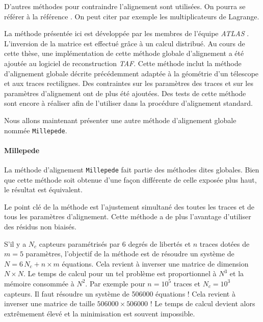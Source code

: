    D'autres m\'ethodes pour contraindre l'alignement sont utilis\'ees. On pourra se r\'ef\'erer \`a la r\'ef\'erence \cite{de2012alignment}. On peut citer par exemple les multiplicateurs de Lagrange.
   
   \medskip
   
   La m\'ethode pr\'esent\'ee ici est d\'evelopp\'ee par les membres de l'\'equipe \textit{ATLAS} \cite{de2012alignment} \cite{Bruckman:2005uxa}. L'inversion de la matrice est effectu\'e grâce \`a un calcul distribu\'e. Au cours de cette th\`ese, une impl\'ementation de cette m\'ethode globale d'alignement a \'et\'e ajout\'ee au logiciel de reconstruction \textit{TAF}. Cette m\'ethode inclut la m\'ethode d'alignement globale d\'ecrite pr\'ec\'edemment adapt\'ee \`a la g\'eom\'etrie d'un t\'elescope et aux traces rectilignes. Des contraintes sur les param\`etres des traces et sur les param\`etres d'alignement ont de plus \'et\'e ajout\'ees. Des tests de cette m\'ethode sont encore \`a r\'ealiser afin de l'utiliser dans la proc\'edure d'alignement standard.
   
   \medskip
   
   Nous allons maintenant pr\'esenter une autre m\'ethode d'alignement globale nomm\'ee \texttt{Millepede}.
   
   \paragraph{Millepede}
   
  La m\'ethode d'alignement \texttt{Millepede} \cite{Blobel:2002ax} \cite{Blobel20065} fait partie des m\'ethodes dites globales. Bien que cette m\'ethode soit obtenue d'une façon diff\'erente de celle expos\'ee plus haut, le r\'esultat est \'equivalent.

  \medskip

  Le point cl\'e de la m\'ethode est l'ajustement simultan\'e des toutes les traces et de tous les param\`etres d'alignement. Cette m\'ethode a de plus l'avantage d'utiliser des r\'esidus non biais\'es. 
  
  \medskip
  
  S'il y a $N_c$ capteurs param\'etris\'es par $6$ degr\'es de libert\'es et $n$ traces dot\'ees de $m=5$ param\`etres, l'objectif de la m\'ethode est de r\'esoudre un syst\`eme de $N = 6 \, N_c + n \times m$ \'equations. Cela revient \`a inverser une matrice de dimension $N \times N$. Le temps de calcul pour un tel probl\`eme est proportionnel \`a $N^3$ et la m\'emoire consomm\'ee \`a $N^2$. Par exemple pour $n=10^5$ traces et $N_c = 10^3$ capteurs. Il faut r\'esoudre un syst\`eme de 506000 \'equations ! Cela revient \`a inverser une matrice de taille $506000 \times 506000$ ! Le temps de calcul devient alors extr\^emement \'elev\'e et la minimisation est souvent impossible.
  
